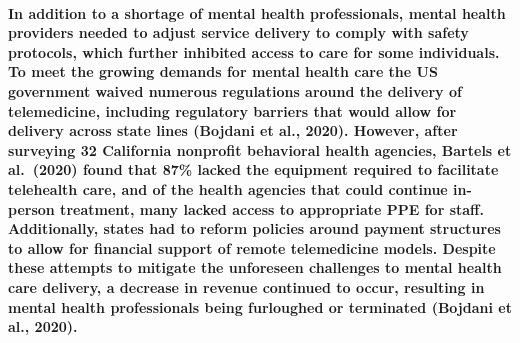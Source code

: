 \documentclass[
  12pt,
]{article}
\begin{document}
{\paragraph{In addition to a shortage of mental health professionals,
mental health providers needed to adjust service delivery to comply with
safety protocols, which further inhibited access to care for some
individuals. To meet the growing demands for mental health care the US
government waived numerous regulations around the delivery of
telemedicine, including regulatory barriers that would allow for
delivery across state lines (Bojdani et al., 2020). However, after
surveying 32 California nonprofit behavioral health agencies, Bartels et
al.~(2020) found that 87\% lacked the equipment required to facilitate
telehealth care, and of the health agencies that could continue
in-person treatment, many lacked access to appropriate PPE for staff.
Additionally, states had to reform policies around payment structures to
allow for financial support of remote telemedicine models. Despite these
attempts to mitigate the unforeseen challenges to mental health care
delivery, a decrease in revenue continued to occur, resulting in mental
health professionals being furloughed or terminated (Bojdani et al.,
2020).}\label{in-addition-to-a-shortage-of-mental-health-professionals-mental-health-providers-needed-to-adjust-service-delivery-to-comply-with-safety-protocols-which-further-inhibited-access-to-care-for-some-individuals.-to-meet-the-growing-demands-for-mental-health-care-the-us-government-waived-numerous-regulations-around-the-delivery-of-telemedicine-including-regulatory-barriers-that-would-allow-for-delivery-across-state-lines-bojdani-et-al.-2020.-however-after-surveying-32-california-nonprofit-behavioral-health-agencies-bartels-et-al.-2020-found-that-87-lacked-the-equipment-required-to-facilitate-telehealth-care-and-of-the-health-agencies-that-could-continue-in-person-treatment-many-lacked-access-to-appropriate-ppe-for-staff.-additionally-states-had-to-reform-policies-around-payment-structures-to-allow-for-financial-support-of-remote-telemedicine-models.-despite-these-attempts-to-mitigate-the-unforeseen-challenges-to-mental-health-care-delivery-a-decrease-in-revenue-continued-to-occur-resulting-in-mental-health-professionals-being-furloughed-or-terminated-bojdani-et-al.-2020.}}
\end{document}
